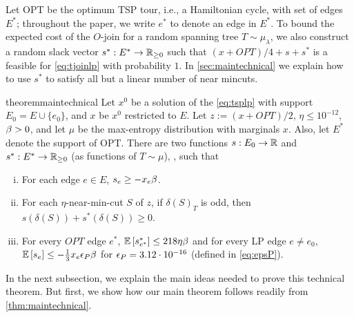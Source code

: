Let OPT be the optimum TSP tour, i.e., a Hamiltonian cycle, with set of edges $E^*$; throughout the paper, we write $e^*$ to denote an edge in $E^*$. %
To bound the expected cost of the $O$-join for a random spanning tree $T\sim\mu_\lambda$, we also construct a random slack vector $s^*:E^*\to \mathbb{R}_{\geq 0}$ such that $(x+OPT)/4 + s + s^*$ is a feasible for \cref{eq:tjoinlp} with probability $1$. In \cref{sec:maintechnical} we explain how to use  $s^*$ to satisfy all but a linear number of near mincuts.
\begin{restatable}{theorem}{maintechnical}\label{thm:maintechnical}
Let $x^0$ be a solution of the \ref{eq:tsplp} with support $E_0=E\cup \{e_0\}$, and $x$ be $x^0$ restricted to $E$.
Let $z:= (x+ OPT)/2$, $\eta\leq 10^{-12}$, $\beta >0$, and let $\mu$ be  the max-entropy distribution with marginals  $x$. %
Also, let $E^*$ denote the support of OPT. 
There are two functions $s: E_0\rightarrow \mathbb{R}$ and $s^*: E^* \rightarrow \mathbb{R} _{\ge 0}$ (as functions of $T\sim\mu$), , such that
\begin{enumerate}[i)]
\item 	For each edge $e \in E$, $s_e \ge -x_e \beta$. 
\item
For each $\eta$-near-min-cut $S$ of $z$, if $\delta(S)_T$ is odd, then
$  s(\delta(S)) + s^*(\delta(S)) \ge  0.$
\item For every $OPT$ edge $e^*$, ${\mathbb{E}}\left[s^*_{e^*}\right]\leq 218\eta\beta$ and for every LP edge $e\neq e_0$, ${\mathbb{E}}\left[s_e\right]\leq -\frac{1}{3}x_e {\epsilon}_P\beta$ for ${\epsilon}_P = 3.12 \cdot 10^{-16}$ (defined in \eqref{eq:epsP}).
\end{enumerate}
\end{restatable}
 In the next subsection, we explain the main ideas needed to prove this technical theorem. But first, we show how our main theorem follows readily from \cref{thm:maintechnical}.
